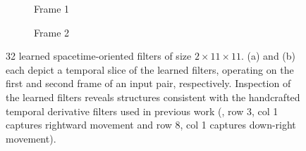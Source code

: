 \begin{figure}
	\centering
	\begin{subfigure}[b]{0.25\textwidth}
		\vspace{-0.45cm}
		\caption{Frame 1}
	\end{subfigure}\hspace{5mm}%
	\begin{subfigure}[b]{0.25\textwidth}
		\vspace{-0.45cm}
		\caption{Frame 2}
	\end{subfigure}
	\caption[Learned spacetime-oriented filters]{32 learned spacetime-oriented filters of size $2 \times 11 \times 11$. (a) and (b) each depict a temporal slice of the learned filters, operating on the first and second frame of an input pair, respectively. Inspection of the learned filters reveals structures consistent with the handcrafted temporal derivative filters used in previous work \cite{derpanis2012spacetime} (\eg, row 3, col 1 captures rightward movement and row 8, col 1 captures down-right movement).}
	\label{fig:filters}
\end{figure}